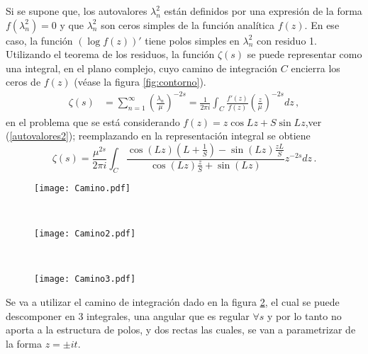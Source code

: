 Si se supone que, los autovalores $\lambda ^2 _n$ están definidos por una expresión de
la forma $f ( \lambda ^2 _ n ) = 0$ y que $\lambda ^2 _n$  son ceros simples de la función analítica $f (z)$.
En ese caso, la función $( \log f (z))'$ tiene polos simples en $\lambda ^2 _n$ con residuo 1.
Utilizando el teorema de los residuos, la función $\zeta (s)$ se puede representar
como una integral, en el plano complejo, cuyo camino de integración $C$
encierra los ceros de $f (z)$ (véase la figura \ref{fig:contorno}).
\begin{equation}
\begin{aligned}
   \zeta  (s) &=  \sum _{n=1} ^{\infty} \left( \frac{\lambda _n}{\mu} \right) ^{-2s} 
   =  
   \frac{1}{2 \pi i} \int _{C} \frac{f'(z)}{f(z)} \left( \frac{z}{\mu} \right) ^{-2s} dz \, ,
\end{aligned}
\label{asd}
\end{equation}
en el problema que se está considerando $f(z) = z \cos Lz + S \sin Lz$,ver (\ref{autovalores2}); reemplazando en la representación integral se obtiene
\begin{equation}
	\zeta  (s) = 
    \frac{\mu ^{2s}}{2 \pi i} \int _{C}
    \frac{ \cos (L z) \left(L + \frac{1}{S} \right) - \sin(L z) \frac{z L}{S}
    }
    { \cos(L z) \frac{z}{S} + \sin(L z)
    }
     z  ^{-2 s} dz  \, .
\end{equation}
\begin{figure*}[t!]
    \centering
    \begin{subfigure}[t]{0.3\textwidth}
        \centering
        \texttt{[image: Camino.pdf]}
        \caption{}
        \label{fig.izquierda_2}
    \end{subfigure}%
    ~ 
    \begin{subfigure}[t]{0.3\textwidth}
        \centering
        \texttt{[image: Camino2.pdf]}
        \caption{}
        \label{fig.medio}
    \end{subfigure}
    ~
    \begin{subfigure}[t]{0.3\textwidth}
        \centering
        \texttt{[image: Camino3.pdf]}
        \caption{}
        \label{fig.derecha.derecha}
    \end{subfigure}
    \caption{Estos caminos son los tenidos en cuenta para representar a la {\it función-$\zeta$} como una integral en el plano complejo.}
\label{fig:contorno}
\end{figure*}
Se va a utilizar el camino de integración dado en la figura \ref{fig.medio}, el cual se puede descomponer en 3 integrales, una angular que es regular $ \forall s$ y por lo tanto no aporta a la estructura de polos, y dos rectas las cuales, se van a parametrizar de la forma $z = \pm i  t$. 
